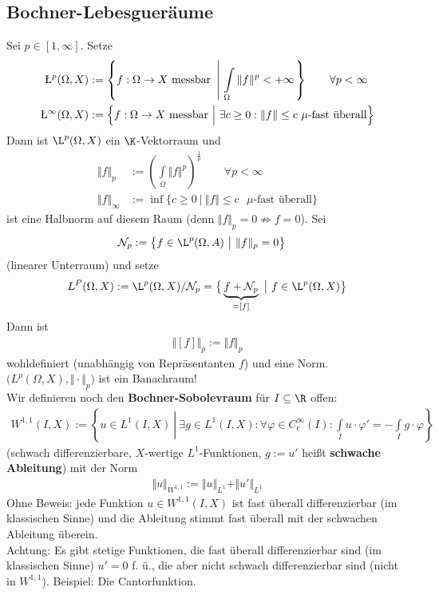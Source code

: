 \subsection*{Bochner-Lebesgueräume}
Sei $p\in[1,\infty]$. Setze
\begin{align*}
\L^p(\Omega,X)&:=\left\lbrace f:\Omega\to X\text{ messbar }\left|~\int\limits_\Omega\Vert f\Vert^p<+\infty\right.\right\rbrace\qquad\forall p<\infty\\
\L^\infty(\Omega,X)&:=\Big\lbrace f:\Omega\to X\text{ messbar }\Big|~\exists   c\geq0:\Vert f\Vert\leq c\text{ $\mu$-fast überall}\Big\rbrace
\end{align*}
Dann ist $\L^p(\Omega,X)$ ein $\K$-Vektorraum und 
\begin{align*}
\Vert f\Vert_p&:=\left(\int\limits_\Omega\Vert f\Vert^p\right)^{\frac{1}{p}}\qquad\forall p<\infty\\
\Vert f\Vert_\infty&:=\inf\limits\big\lbrace c\geq 0~\big|~\Vert f\Vert\leq c\text{ $\mu$-fast überall}\big\rbrace
\end{align*}
ist eine Halbnorm auf diesem Raum (denn $\Vert f\Vert_p=0\not\Rightarrow f=0$). Sei
\begin{align*}
\mathcal{N}_p&:=\big\lbrace f\in \L^p(\Omega,A)~\big|~\Vert f\Vert_p=0\big\rbrace
\end{align*}
(linearer Unterraum) und setze
\begin{align*}
L^P(\Omega,X):=\L^p(\Omega,X)/\mathcal{N}_p
=\big\lbrace \underbrace{f+\mathcal{N}_p}_{=[f]}~\big|~f\in\L^p(\Omega,X)\big\rbrace
\end{align*}
Dann ist
\begin{align*}
\big\Vert[f]\big\Vert_p:=\Vert f\Vert_p
\end{align*}
wohldefiniert (unabhängig von Repräsentanten $f$) und eine Norm. $\big(L^p(\Omega,X),\Vert\cdot\Vert_p\big)$ ist ein  Banachraum!\\
Wir definieren noch den \textbf{Bochner-Sobolevraum} für $I\subseteq\R$ offen:
\begin{align*}
W^{1,1}(I,X):=\left\lbrace u\in L^1(I,X)~\left|~\exists g\in L^1(I,X):\forall\varphi\in C_c^\infty(I):\int\limits_I u\cdot\varphi'=-\int\limits_I g\cdot\varphi\right.\right\rbrace
\end{align*}
(schwach differenzierbare, $X$-wertige $L^1$-Funktionen, $g:=u'$ heißt \textbf{schwache Ableitung}) mit der Norm
\begin{align*}
\Vert u\Vert_{W^{1,1}}:=\Vert u\Vert_{L^1}+\Vert u'\Vert_{L^1}
\end{align*}
Ohne Beweis: jede Funktion $u\in W^{1,1}(I,X)$ ist fast überall differenzierbar (im klassischen Sinne) und die Ableitung stimmt fast überall mit der schwachen Ableitung überein.\\
Achtung: Es gibt stetige Funktionen, die fast überall differenzierbar sind (im klassischen Sinne) $u'=0$ f. ü., die aber nicht schwach differenzierbar sind (nicht in $W^{1,1}$). Beispiel: Die Cantorfunktion.\\

